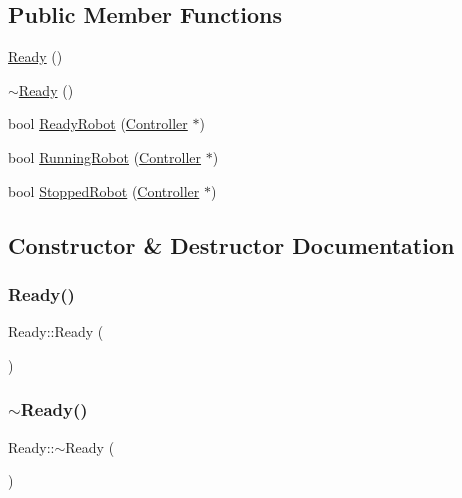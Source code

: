\subsection*{Public Member Functions}
\begin{DoxyCompactItemize}
\item 
\mbox{\hyperlink{class_ready_a21c2af0d849e8a7bd0b72172b8bff32d}{Ready}} ()
\item 
\mbox{\hyperlink{class_ready_ae2b3510201faea89c2ed28eaa79fb67e}{$\sim$\+Ready}} ()
\item 
bool \mbox{\hyperlink{class_ready_abc21fdcc13ef0bd14361cdd1b2cd73a6}{Ready\+Robot}} (\mbox{\hyperlink{class_controller}{Controller}} $\ast$)
\item 
bool \mbox{\hyperlink{class_ready_a963ef4cb03dacb0b1f31eb4125b7fd68}{Running\+Robot}} (\mbox{\hyperlink{class_controller}{Controller}} $\ast$)
\item 
bool \mbox{\hyperlink{class_ready_a88f3f1d4ef8b595ab9b9e421aa3a45c8}{Stopped\+Robot}} (\mbox{\hyperlink{class_controller}{Controller}} $\ast$)
\end{DoxyCompactItemize}


\subsection{Constructor \& Destructor Documentation}
\mbox{\label{class_ready_a21c2af0d849e8a7bd0b72172b8bff32d}} 
\subsubsection{\texorpdfstring{Ready()}{Ready()}}
{\footnotesize\ttfamily Ready\+::\+Ready (\begin{DoxyParamCaption}{ }\end{DoxyParamCaption})}

\mbox{\label{class_ready_ae2b3510201faea89c2ed28eaa79fb67e}} 
\subsubsection{\texorpdfstring{$\sim$Ready()}{~Ready()}}
{\footnotesize\ttfamily Ready\+::$\sim$\+Ready (\begin{DoxyParamCaption}{ }\end{DoxyParamCaption})}



